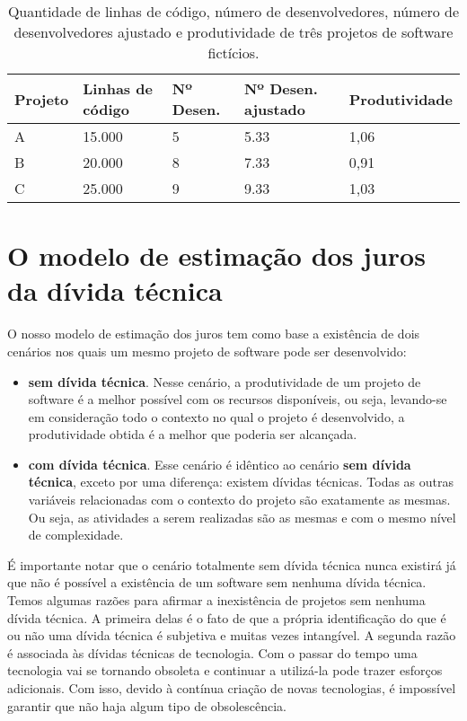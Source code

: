 \begin{table}[H]
\centering
\begin{tabular}{lllll}
\hline
\textbf{Projeto} & \textbf{Linhas de código} & \textbf{Nº Desen.} & \textbf{Nº  Desen. ajustado}  & \textbf{Produtividade}\\ \hline
A                & 15.000                     & 5       & 5.33  &        1,06          \\ \hline
B                & 20.000                     & 8       & 7.33   &       0,91         \\ \hline
C                & 25.000                     & 9        & 9.33    &      1,03         \\ \hline
\end{tabular}
\caption{Quantidade de linhas de código, número de desenvolvedores, número de desenvolvedores ajustado e produtividade de três projetos de software fictícios.}
\label{tab:examplo_aplicacao_modelo_produtividade}
\end{table}





\section{O modelo de estimação dos juros da dívida técnica}
\label{modelo_abstrato}


O nosso modelo de estimação dos juros tem como base a existência de dois cenários nos quais um mesmo projeto de software pode ser desenvolvido:

\begin{itemize} 
\item  \textbf{sem dívida técnica}. Nesse cenário, a produtividade de um projeto de software é a melhor possível com os recursos disponíveis, ou seja, levando-se em consideração todo o contexto no qual o projeto é desenvolvido, a produtividade obtida é a melhor que poderia ser alcançada. 
\item \textbf{com dívida técnica}. Esse cenário é idêntico ao cenário \textbf{sem dívida técnica}, exceto por uma diferença: existem dívidas técnicas.   Todas as outras variáveis relacionadas com o contexto do projeto são exatamente as mesmas. Ou seja, as atividades a serem realizadas são as mesmas e com o mesmo nível de complexidade.
\end{itemize}

  

É importante notar que o cenário totalmente sem dívida técnica nunca existirá já que não é possível a existência de um software sem nenhuma dívida técnica. Temos algumas razões para afirmar a inexistência de projetos sem nenhuma dívida técnica. A primeira delas é o fato de que a própria identificação do que é ou não uma dívida técnica é subjetiva e muitas vezes intangível. A segunda razão é associada às dívidas técnicas de tecnologia. Com o passar do tempo uma tecnologia vai se tornando obsoleta e continuar a utilizá-la pode trazer esforços adicionais. Com isso, devido à contínua criação de novas tecnologias, é impossível garantir que não haja algum tipo de obsolescência. 


